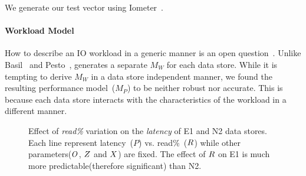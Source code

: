 We generate our test vector using Iometer~\cite{sievert:2004}.

\paragraph{Workload Model}
How to describe an IO workload in a generic manner is an open question~\cite{liu:2008, wang:2004, kavalanekar:2008, tarasov:2012}.
Unlike Basil~\cite{gulati:2010} and Pesto~\cite{gulati:2011}, \romano generates a separate $M_W$ for each data store.
While it is tempting to derive $M_W$ in a data store independent manner, we found the resulting performance model~($M_P$) to be neither robust nor accurate.
This is because each data store interacts with the characteristics of the workload in a different manner.
\begin{figure}[!t]
\centering
{}
\caption{Effect of \emph{read\%} variation on the \emph{latency} of E1 and N2 data stores.
Each line represent latency~($P$) vs. read\%~($R$) while other parameters($O$, $Z$ and $X$) are fixed.
The effect of $R$ on E1 is much more predictable(therefore significant) than N2.
}
\label{readParam}
\end{figure}
